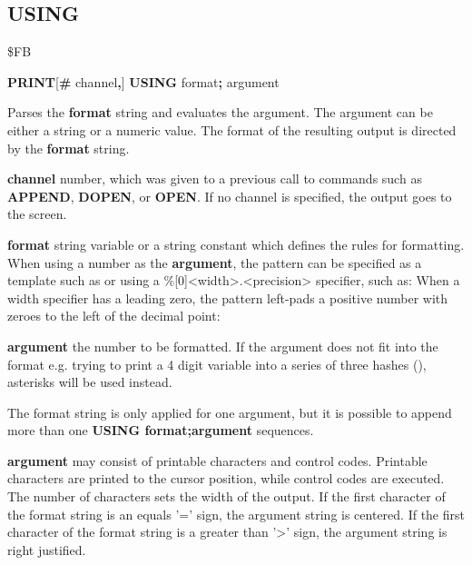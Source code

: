 \subsection{USING}
\begin{description}[leftmargin=2cm,style=nextline]
\item [Token:] \$FB
\item [Format:] {\bf PRINT}[{\bf\#} channel{\bf,}] {\bf USING} format{\bf;} argument
\item [Usage:]  Parses the {\bf format} string and evaluates the argument.
                The argument can be either a string or a numeric value.
                The format of the resulting output is directed
                by the {\bf format} string.

                {\bf channel} number, which was given to a previous
                call to commands such as {\bf APPEND}, {\bf DOPEN}, or {\bf OPEN}.
                If no channel is specified, the output goes to the screen.

                {\bf format} string variable or a string constant
                which defines the rules for formatting.
                When using a number as the {\bf argument}, the pattern can be specified as a template such as  
                or using a \%[0]<width>.<precision> specifier, such as:  When a width specifier has a leading zero, the pattern left-pads a positive number with zeroes to the left of the decimal point: 

                {\bf argument} the number to be formatted. If the argument does not fit into the format
                e.g. trying to print a 4 digit variable into a series of three
                hashes (\screentext{\#\#\#}), asterisks will be used instead.

\item [Remarks:] The format string is only applied for one argument,
                 but it is possible to append more than one
                 {\bf USING format;argument} sequences.

                {\bf argument} may consist of printable
                characters and control codes. Printable characters
                are printed to the cursor position, while control
                codes are executed.
                The number of \screentext{\#} characters sets the width of the output.
                If the first character of the format string
                is an equals '=' sign, the argument string is centered.
                If the first character of the format string
                is a greater than '>' sign, the argument string is right justified.


\end{description}
